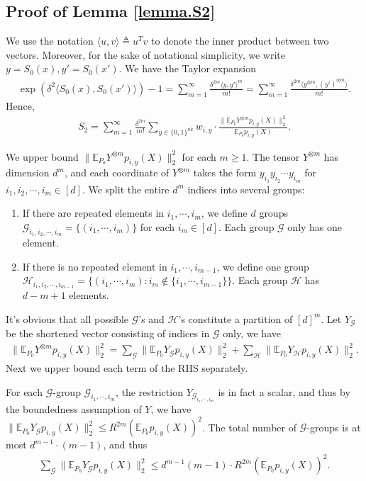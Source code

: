 \documentclass[final,12pt]{colt2018} %
\def \bE {\mathbb{E}}
\newcommand{\jiao}[1]{\langle{#1}\rangle}
\newcommand{\calG}{{\mathcal{G}}}
\newcommand{\calH}{{\mathcal{H}}}
\begin{document}
\subsection{Proof of Lemma \ref{lemma.S2}}
We use the notation $\jiao{u,v}\triangleq u^Tv$ to denote the inner product between two vectors. Moreover, for the sake of notational simplicity, we write $y=S_0(x), y'=S_0(x')$. We have the Taylor expansion
\begin{align*}
\exp(\delta^2 \jiao{S_0(x), S_0(x')}) - 1 = \sum_{m = 1}^\infty \frac{\delta^{2m}\jiao{y, y'}^m}{m!} = \sum_{m=1}^\infty \frac{\delta^{2m}\jiao{y^{\otimes m}, (y')^{\otimes m}}}{m!}.
\end{align*}
Hence, 
\begin{align}\label{eq.Taylor_S2}
S_2 = \sum_{m=1}^\infty \frac{\delta^{2m}}{m!} \sum_{y\in\{0,1\}^{nk} }w_{i,y}\cdot \frac{ \|\bE_{P_0} Y^{\otimes m}p_{i,y}(X)\|_2^2 }{ \bE_{P_0} p_{i,y}(X) }. 
\end{align}

We upper bound $\|\bE_{P_0} Y^{\otimes m}p_{i,y}(X)\|_2^2$ for each $m\ge 1$. The tensor $Y^{\otimes m}$ has dimension $d^m$, and each coordinate of $Y^{\otimes m}$ takes the form $y_{i_1}y_{i_2}\cdots y_{i_m}$ for $i_1,i_2,\cdots,i_m\in [d]$. We split the entire $d^m$ indices into several groups: 
\begin{enumerate}
	\item If there are repeated elements in $i_1,\cdots,i_{m}$, we define $d$ groups $\calG_{i_1,i_2,\cdots,i_m} = \{ (i_1,\cdots,i_m) \}$ for each $i_m\in [d]$. Each group $\calG$ only has one element. 
	\item If there is no repeated element in $i_1,\cdots,i_{m-1}$, we define one group $\calH_{i_1,i_2,\cdots,i_{m-1}} = \{ (i_1,\cdots,i_m): i_m\notin \{i_1,\cdots,i_{m-1}\} \}$. Each group $\calH$ has $d-m+1$ elements. 
\end{enumerate}

It's obvious that all possible $\calG$'s and $\calH$'s constitute a partition of $[d]^m$. Let $Y_\calG$ be the shortened vector consisting of indices in $\calG$ only, we have
\begin{align*}
\|\bE_{P_0} Y^{\otimes m}p_{i,y}(X)\|_2^2 = \sum_{\calG} \|\bE_{P_0} Y_\calG p_{i,y}(X)\|_2^2 + \sum_{\calH} \|\bE_{P_0} Y_\calH p_{i,y}(X)\|_2^2. 
\end{align*}
Next we upper bound each term of the RHS separately. 

For each $\calG$-group $\calG_{i_1,\cdots,i_m}$, the restriction $Y_{\calG_{i_1,\cdots,i_m}}$ is in fact a scalar, and thus by the boundedness assumption of $Y$, we have $\|\bE_{P_0} Y_\calG p_{i,y}(X)\|_2^2 \le R^{2m} (\bE_{P_0} p_{i,y}(X))^2$. The total number of $\calG$-groups is at most $d^{m-1}\cdot (m-1)$, and thus
\begin{align}\label{eq.G_group}
\sum_{\calG} \|\bE_{P_0} Y_\calG p_{i,y}(X)\|_2^2 \le d^{m-1}(m-1)\cdot R^{2m}(\bE_{P_0} p_{i,y}(X))^2. 
\end{align}
\end{document}
